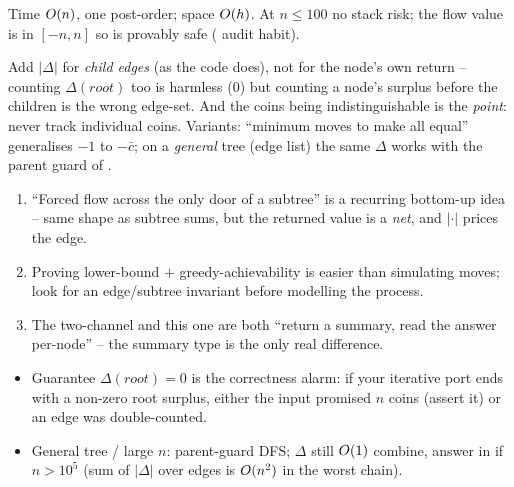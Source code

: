 \begin{complexitybox}
Time $O(n)$, one post-order; space $O(h)$. At $n\le100$ no stack risk;
the flow value is in $[-n,n]$ so  is provably safe (
audit habit).
\end{complexitybox}

\begin{warningbox}
Add $|\Delta|$ for \emph{child edges} (as the code does), not for the node's own
return -- counting $\Delta(\mathit{root})$ too is harmless ($0$) but counting a
node's surplus before the children is the wrong edge-set. And the coins being
indistinguishable is the \emph{point}: never track individual coins. Variants:
``minimum moves to make all equal'' generalises $-1$ to $-\bar c$; on a
\emph{general} tree (edge list) the same $\Delta$ works with the parent guard of
.
\end{warningbox}

\begin{insightbox}
\begin{enumerate}[nosep, leftmargin=1.6em]
  \item ``Forced flow across the only door of a subtree'' is a recurring
        bottom-up idea -- same shape as subtree sums, but the returned value is a
        \emph{net}, and $|\cdot|$ prices the edge.
  \item Proving lower-bound $+$ greedy-achievability is easier than simulating
        moves; look for an edge/subtree invariant before modelling the process.
  \item The two-channel  and this one are both ``return a
        summary, read the answer per-node'' -- the summary type is the only real
        difference.
\end{enumerate}
\end{insightbox}

\begin{hardeningbox}
\begin{itemize}[nosep, leftmargin=1.4em]
  \item Guarantee $\Delta(\mathit{root}){=}0$ is the correctness alarm: if your
        iterative port ends with a non-zero root surplus, either the input
        promised $n$ coins (assert it) or an edge was double-counted.
  \item General tree / large $n$: parent-guard DFS; $\Delta$ still $O(1)$
        combine, answer in  if $n>10^{5}$ (sum of $|\Delta|$
        over edges is $O(n^2)$ in the worst chain).
\end{itemize}
\end{hardeningbox}


